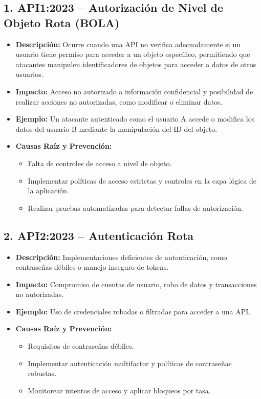 \documentclass[a4paper,12pt]{article}
\begin{document}
\subsection{1. API1:2023 – Autorización de Nivel de Objeto Rota (BOLA)}
\begin{itemize}
    \item \textbf{Descripción:} Ocurre cuando una API no verifica adecuadamente si un usuario tiene permiso para acceder a un objeto específico, permitiendo que atacantes manipulen identificadores de objetos para acceder a datos de otros usuarios.
    \item \textbf{Impacto:} Acceso no autorizado a información confidencial y posibilidad de realizar acciones no autorizadas, como modificar o eliminar datos.
    \item \textbf{Ejemplo:} Un atacante autenticado como el usuario A accede o modifica los datos del usuario B mediante la manipulación del ID del objeto.
    \item \textbf{Causas Raíz y Prevención:}
    \begin{itemize}
        \item Falta de controles de acceso a nivel de objeto.
        \item Implementar políticas de acceso estrictas y controles en la capa lógica de la aplicación.
        \item Realizar pruebas automatizadas para detectar fallas de autorización.
    \end{itemize}
\end{itemize}
\subsection{2. API2:2023 – Autenticación Rota}
\begin{itemize}
    \item \textbf{Descripción:} Implementaciones deficientes de autenticación, como contraseñas débiles o manejo inseguro de tokens.
    \item \textbf{Impacto:} Compromiso de cuentas de usuario, robo de datos y transacciones no autorizadas.
    \item \textbf{Ejemplo:} Uso de credenciales robadas o filtradas para acceder a una API.
    \item \textbf{Causas Raíz y Prevención:}
    \begin{itemize}
        \item Requisitos de contraseñas débiles.
        \item Implementar autenticación multifactor y políticas de contraseñas robustas.
        \item Monitorear intentos de acceso y aplicar bloqueos por tasa.
    \end{itemize}
\end{itemize}
\end{document}
